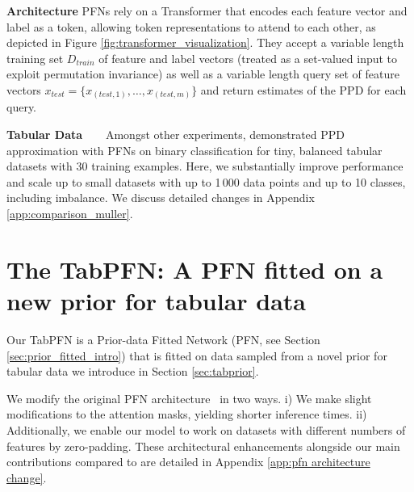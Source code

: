 \textbf{Architecture} 
PFNs rely on a Transformer \citep{vaswani-neurips17a} that encodes each feature vector and label as a token, allowing token representations to attend to each other, as depicted in Figure \ref{fig:transformer_visualization}.
They accept a variable length training set $D_{train}$ of feature and label vectors (treated as a set-valued input to exploit permutation invariance) as well as a variable length query set of feature vectors $x_{test} = \{x_{({test},1)}, \dots, x_{({test},m)}\}$ and return estimates of the PPD for each query.

\textbf{Tabular Data~~~} Amongst other experiments, \cite{muller-iclr22a} demonstrated PPD approximation with PFNs on binary classification for tiny, balanced tabular datasets with $30$ training examples. Here, we substantially improve performance and scale up to small datasets with up to 1\,000 data points and up to 10 classes, including imbalance. We discuss detailed changes in Appendix \ref{app:comparison_muller}.

\section{The TabPFN: A PFN fitted on a new prior for tabular data}\label{sec:tabpfn}

Our TabPFN is a Prior-data Fitted Network (PFN, see Section \ref{sec:prior_fitted_intro}) that is fitted on data sampled from a novel prior for tabular data we introduce in Section \ref{sec:tabprior}. 

We modify the original PFN architecture~\citep{muller-iclr22a} in two ways. i) We make slight modifications to the attention masks, yielding shorter inference times. ii) Additionally, we enable our model to work on datasets with different numbers of features by zero-padding. These architectural enhancements alongside our main contributions compared to \cite{muller-iclr22a} are detailed in Appendix \ref{app:pfn architecture change}.

